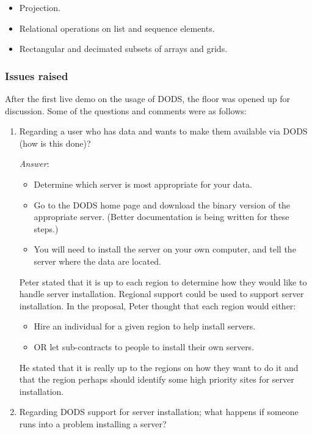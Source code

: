 \begin{itemize}
\item Projection.
\item Relational operations on list and sequence elements.
\item Rectangular and decimated subsets of arrays and grids.
\end{itemize}

\subsubsection{Issues raised}

After the first live demo on the usage of DODS, the floor was opened
up for discussion. Some of the questions and comments were as follows:

\begin{enumerate}
\item Regarding a user who has data and wants to make them available via
  DODS (how is this done)?  

\emph{Answer}:
  \begin{itemize}
  \item Determine which server is most appropriate for your data.
  \item Go to the DODS home page and download the binary version of
    the appropriate server. (Better documentation is being written for
    these steps.)
  \item You will need to install the server on your own computer, and
    tell the server where the data are located.
\end{itemize}

Peter stated that it is up to each region to determine how they would
like to handle server installation.  Regional support could be used to
support server installation.  In the proposal, Peter thought that each
region would either:

\begin{itemize}
  \item Hire an individual for a given region to help install servers.
  \item OR let sub-contracts to people to install their own servers.
\end{itemize}

He stated that it is really up to the regions on how they want to do
it and that the region perhaps should identify some high priority
sites for server installation.

\item Regarding DODS support for server installation; what happens if
  someone runs into a problem installing a server?  


\end{enumerate}
